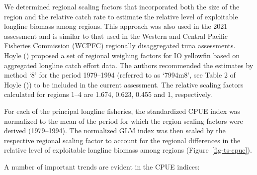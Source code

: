 \documentclass[
]{scrartcl}
\begin{document}
We determined regional scaling factors that incorporated both the size
of the region and the relative catch rate to estimate the relative level
of exploitable longline biomass among regions. This approach was also
used in the 2021 assessment and is similar to that used in the Western
and Central Pacific Fisheries Commission (WCPFC) regionally
disaggregated tuna assessments. Hoyle
() proposed a set of
regional weighing factors for IO yellowfin based on aggregated longline
catch effort data. The authors recommended the estimates by method `8'
for the period 1979--1994 (referred to as `7994m8', see Table 2 of Hoyle
()) to be included in
the current assessment. The relative scaling factors calculated for
regions 1--4 are 1.674, 0.623, 0.455 and 1, respectively.

For each of the principal longline fisheries, the standardized CPUE
index was normalized to the mean of the period for which the region
scaling factors were derived (1979--1994). The normalized GLM index was
then scaled by the respective regional scaling factor to account for the
regional differences in the relative level of exploitable longline
biomass among regions (Figure~\ref{fig-ts-cpue}).

A number of important trends are evident in the CPUE indices:
\end{document}
